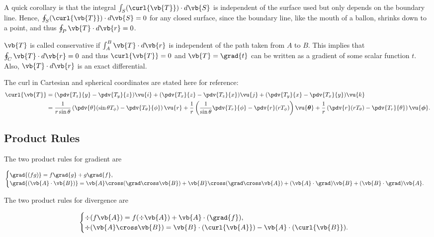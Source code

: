 \documentclass[english,a4paper,12pt]{report}
\begin{document}
A quick corollary is that the integral \(\int_{S} (\curl{\vb{T}}) \cdot d\vb{S}\) is independent of the surface used but only depends on the boundary line. Hence, \( \oint_{S} (\curl{\vb{T}}) \cdot d\vb{S} = 0\) for any closed surface, since the boundary line, like the mouth of a ballon, shrinks down to a point, and thus \(\oint_{P} \vb{T} \cdot d\vb{r} = 0\).

\(\vb{T} \) is called conservative if \(\int_{A}^{B}  \vb{T} \cdot d\vb{r}  \) is independent of the path taken from \(A\) to \(B\). This implies that \( \oint_{C} \vb{T} \cdot d\vb{r} = 0\) and thus \(\curl{\vb{T} } = 0\) and \(\vb{T} = \grad{t} \) can be written as a gradient of some scalar function \(t\). Also, \(\vb{T} \cdot d\vb{r} \) is an exact differential.      

The curl in Cartesian and spherical coordinates are stated here for reference:
\begin{equation} 
	\begin{aligned}
	\curl{\vb{T}} &= (\pdv{T_z}{y} - \pdv{T_y}{z})\vu{i} + (\pdv{T_x}{z} - \pdv{T_z}{x})\vu{j} + (\pdv{T_y}{x} - \pdv{T_x}{y})\vu{k} \\ &= \frac{1}{r\sin{\theta}}\left(\pdv{\theta}(\sin{\theta}T_{\phi}) - \pdv{T_{\theta}}{\phi}\right)\vu{r} + \frac{1}{r}\left(\frac{1}{\sin{\theta}}\pdv{T_r}{\phi} - \pdv{r}(rT_{\phi})\right)\vu{\boldsymbol{\theta } } + \frac{1}{r}\left(\pdv{r}(rT_{\theta}) - \pdv{T_r}{\theta}\right)\vu{\boldsymbol{\phi } }. 
    \end{aligned}
\end{equation}
	
\subsection{Product Rules}
The two product rules for gradient are

\begin{equation}
\begin{cases} 
	\grad{(fg)} = f\grad{g} + g\grad{f},  \\
	\grad{(\vb{A} \cdot \vb{B})} = \vb{A} \cross (\grad \cross \vb{B}) + \vb{B} \cross (\grad \cross \vb{A}) + (\vb{A} \cdot \grad)\vb{B} + (\vb{B} \cdot \grad)\vb{A}. 
\end{cases}
\end{equation}
	
The two product rules for divergence are 

\begin{equation}
\begin{cases} 
	\div{(f\vb{A})} = f(\div{\vb{A}}) + \vb{A} \cdot (\grad{f}), \\
	\div (\vb{A} \cross \vb{B}) = \vb{B} \cdot (\curl {\vb{A}}) - \vb{A} \cdot (\curl{\vb{B}}). 
\end{cases}
\end{equation}
\end{document}

